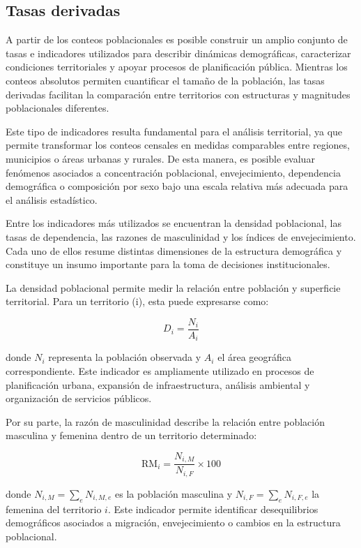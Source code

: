 \documentclass[
  spanish,
]{book}
\begin{document}
\subsection{Tasas derivadas}\label{tasas-derivadas}

A partir de los conteos poblacionales es posible construir un amplio conjunto de tasas e indicadores utilizados para describir dinámicas demográficas, caracterizar condiciones territoriales y apoyar procesos de planificación pública. Mientras los conteos absolutos permiten cuantificar el tamaño de la población, las tasas derivadas facilitan la comparación entre territorios con estructuras y magnitudes poblacionales diferentes.

Este tipo de indicadores resulta fundamental para el análisis territorial, ya que permite transformar los conteos censales en medidas comparables entre regiones, municipios o áreas urbanas y rurales. De esta manera, es posible evaluar fenómenos asociados a concentración poblacional, envejecimiento, dependencia demográfica o composición por sexo bajo una escala relativa más adecuada para el análisis estadístico.

Entre los indicadores más utilizados se encuentran la densidad poblacional, las tasas de dependencia, las razones de masculinidad y los índices de envejecimiento. Cada uno de ellos resume distintas dimensiones de la estructura demográfica y constituye un insumo importante para la toma de decisiones institucionales.

La densidad poblacional permite medir la relación entre población y superficie territorial. Para un territorio (i), esta puede expresarse como:

\[
D_i = \frac{N_i}{A_i}
\]

donde \(N_i\) representa la población observada y \(A_i\) el área geográfica correspondiente. Este indicador es ampliamente utilizado en procesos de planificación urbana, expansión de infraestructura, análisis ambiental y organización de servicios públicos.

Por su parte, la razón de masculinidad describe la relación entre población masculina y femenina dentro de un territorio determinado:

\[
\text{RM}_i = \frac{N_{i,M}}{N_{i,F}} \times 100
\]

donde \(N_{i,M} = \sum_{e} N_{i,M,e}\) es la población masculina y \(N_{i,F} = \sum_{e} N_{i,F,e}\) la femenina del territorio \(i\). Este indicador permite identificar desequilibrios demográficos asociados a migración, envejecimiento o cambios en la estructura poblacional.
\end{document}
